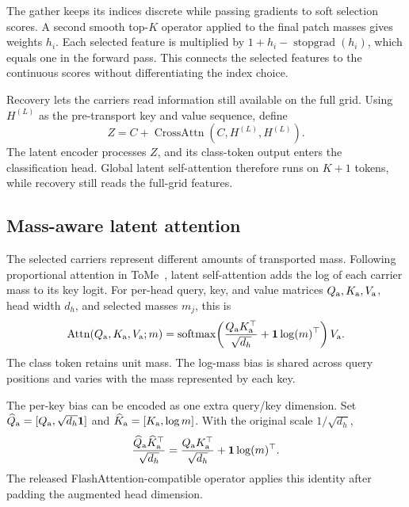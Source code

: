 The gather keeps its indices discrete while passing gradients to soft
selection scores. A second smooth top-$K$ operator applied to the final
patch masses gives weights $h_i$. Each selected feature is multiplied by
$1+h_i-\operatorname{stopgrad}(h_i)$, which equals one in the forward pass.
This connects the selected features to the continuous scores without
differentiating the index choice.

Recovery lets the carriers read information still available on the full
grid. Using $H^{(L)}$ as the pre-transport key and value sequence, define
\begin{equation}
 Z=C+\operatorname{CrossAttn}(C,H^{(L)},H^{(L)}).
 \label{eq:recovery}
\end{equation}
The latent encoder processes $Z$, and its class-token output enters the
classification head. Global latent self-attention therefore runs on $K+1$
tokens, while recovery still reads the full-grid features.

\subsection{Mass-aware latent attention}
The selected carriers represent different amounts of transported mass.
Following proportional attention in ToMe~\citep{tome2023}, latent
self-attention adds the log of each carrier mass to its key logit. For
per-head query, key, and value matrices $Q_{\rm a},K_{\rm a},V_{\rm a}$,
head width $d_h$, and selected masses $m_j$, this is
\begin{equation}
 \operatorname{Attn}(Q_{\rm a},K_{\rm a},V_{\rm a};m)
 =\operatorname{softmax}\!\left(
 \frac{Q_{\rm a}K_{\rm a}^{\top}}{\sqrt{d_h}}
 +\mathbf 1\log(m)^\top\right)V_{\rm a}.
 \label{eq:mass-attn}
\end{equation}
The class token retains unit mass. The log-mass bias is shared across
query positions and varies with the mass represented by each key.

The per-key bias can be encoded as one extra query/key dimension. Set
$\widehat Q_{\rm a}=[Q_{\rm a},\sqrt{d_h}\mathbf 1]$ and
$\widehat K_{\rm a}=[K_{\rm a},\log m]$. With the original scale
$1/\sqrt{d_h}$,
\begin{equation}
 \frac{\widehat Q_{\rm a}\widehat K_{\rm a}^{\top}}{\sqrt{d_h}}
 =\frac{Q_{\rm a}K_{\rm a}^{\top}}{\sqrt{d_h}}
 +\mathbf 1\log(m)^\top.
 \label{eq:augmented-equivalence}
\end{equation}
The released FlashAttention-compatible operator applies this identity after
padding the augmented head dimension.

